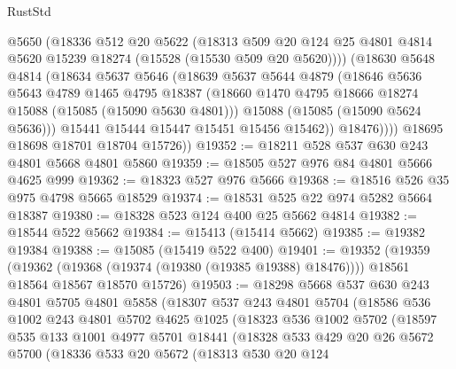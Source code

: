 \begin{lexlean}{RustStd}
\begin{coremodule}
              @5650
              (@18336
                @512
                @20
                @5622
                (@18313
                  @509
                  @20
                  @124
                  @25
                  @4801
                  @4814
                  @5620
                  @15239
                  @18274
                  (@15528 (@15530 @509 @20 @5620))))
              (@18630
                @5648
                @4814
                (@18634
                  @5637
                  @5646
                  (@18639
                    @5637
                    @5644
                    @4879
                    (@18646
                      @5636
                      @5643
                      @4789
                      @1465
                      @4795
                      @18387
                      (@18660 @1470 @4795 @18666 @18274 @15088 (@15085 (@15090 @5630 @4801)))
                      @15088
                      (@15085 (@15090 @5624 @5636)))
                    @15441
                    @15444
                    @15447
                    @15451
                    @15456
                    @15462))
                @18476))))
        @18695
        @18698
        @18701
        @18704
        @15726))
@19352 := @18211 @528 @537 @630 @243 @4801 @5668 @4801 @5860
@19359 := @18505 @527 @976 @84 @4801 @5666 @4625 @999
@19362 := @18323 @527 @976 @5666
@19368 := @18516 @526 @35 @975 @4798 @5665 @18529
@19374 := @18531 @525 @22 @974 @5282 @5664 @18387
@19380 := @18328 @523 @124 @400 @25 @5662 @4814
@19382 := @18544 @522 @5662
@19384 := @15413 (@15414 @5662)
@19385 := @19382 @19384
@19388 := @15085 (@15419 @522 @400)
@19401 := @19352
    (@19359
      (@19362 (@19368 (@19374 (@19380 (@19385 @19388) @18476))))
      @18561
      @18564
      @18567
      @18570
      @15726)
@19503 := @18298
    @5668
    @537
    @630
    @243
    @4801
    @5705
    @4801
    @5858
    (@18307
      @537
      @243
      @4801
      @5704
      (@18586
        @536
        @1002
        @243
        @4801
        @5702
        @4625
        @1025
        (@18323
          @536
          @1002
          @5702
          (@18597
            @535
            @133
            @1001
            @4977
            @5701
            @18441
            (@18328
              @533
              @429
              @20
              @26
              @5672
              @5700
              (@18336
                @533
                @20
                @5672
                (@18313
                  @530
                  @20
                  @124

\end{coremodule}
\end{lexlean}
